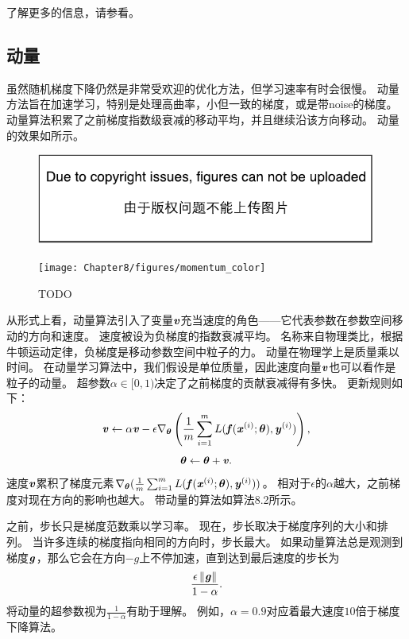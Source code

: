 了解更多的信息，请参看\cite{Bottou98}。

\subsection{动量}
\label{sec:momentum}
虽然随机梯度下降仍然是非常受欢迎的优化方法，但学习速率有时会很慢。
动量方法\citep{polyak1964some}旨在加速学习，特别是处理高曲率，小但一致的梯度，或是带\gls{noise}的梯度。
动量算法积累了之前梯度指数级衰减的移动平均，并且继续沿该方向移动。
动量的效果如所示。

\begin{figure}[!htb]
\ifOpenSource
\centerline{\includegraphics{figure.pdf}}
\else
\centerline{\texttt{[image: Chapter8/figures/momentum\_color]}}
\fi
\caption{TODO}
\label{fig:chap8_momentum}
\end{figure}

从形式上看，动量算法引入了变量$\boldsymbol{\mathit{v}}$充当速度的角色——它代表参数在参数空间移动的方向和速度。
速度被设为负梯度的指数衰减平均。
名称来自物理类比，根据牛顿运动定律，负梯度是移动参数空间中粒子的力。
动量在物理学上是质量乘以时间。
在动量学习算法中，我们假设是单位质量，因此速度向量$\boldsymbol{\mathit{v}}$也可以看作是粒子的动量。
超参数$\alpha\in[0,1)$决定了之前梯度的贡献衰减得有多快。
更新规则如下：
\begin{equation}
\boldsymbol{\mathit{v}} \leftarrow \alpha \boldsymbol{\mathit{v}} - \epsilon \nabla_{\boldsymbol{\theta}} \left( \frac{1}{m} \sum_{i=1}^m  L(\boldsymbol{\mathit{f}}(\boldsymbol{\mathit{x}}^{(i)}; \boldsymbol{\theta}), \boldsymbol{\mathit{y}}^{(i)}   )  \right),
\end{equation}
\begin{equation}
\boldsymbol{\theta} \leftarrow \boldsymbol{\theta}  + \boldsymbol{\mathit{v}} .
\end{equation}
速度$\boldsymbol{\mathit{v}}$累积了梯度元素$\nabla_{\boldsymbol{\theta}}( \frac{1}{m} \sum_{i=1}^m L( \boldsymbol{\mathit{f}}(\boldsymbol{\mathit{x}}^{(i)}; \boldsymbol{\theta}), \boldsymbol{\mathit{y}}^{(i)} )  )$。
相对于$\epsilon$的$\alpha$越大，之前梯度对现在方向的影响也越大。
带动量的算法如算法8.2所示。


之前，步长只是梯度范数乘以学习率。
现在，步长取决于梯度序列的大小和排列。
当许多连续的梯度指向相同的方向时，步长最大。
如果动量算法总是观测到梯度$\boldsymbol{\mathit{g}}$，那么它会在方向$-g$上不停加速，直到达到最后速度的步长为
\begin{equation}
    \frac{\epsilon \left\lVert\boldsymbol{\mathit{g}}\right\rVert}{1-\alpha} .
\end{equation}
将动量的超参数视为$\frac{1}{1-\alpha}$有助于理解。
例如，$\alpha=0.9$对应着最大速度$10$倍于梯度下降算法。

